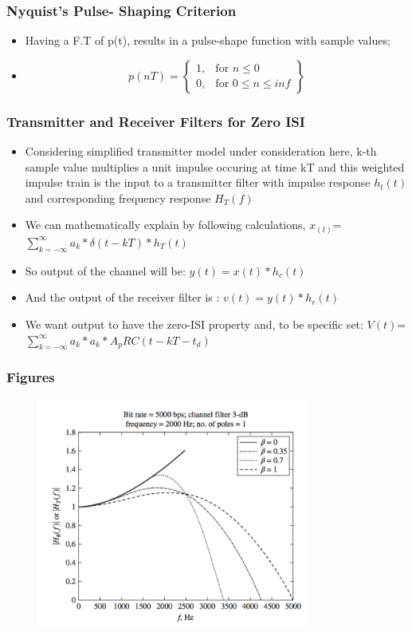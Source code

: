 \documentclass{beamer}
\begin{document}
			\begin{frame}
			\frametitle{Nyquist's Pulse- Shaping Criterion}
			\begin{itemize}
			\item Having a F.T of p(t), results in a pulse-shape function with sample values;
			\item 
			\[
    p(nT) = \left\{\begin{array}{lr}
        1, & \text{for } n\leq 0\\
        0, & \text{for } 0\leq n\leq inf
        \end{array}\right\} 
  \]
  			\end{itemize}
			\end{frame}
			
  			\begin{frame}
			\frametitle{Transmitter and Receiver Filters for Zero ISI}
			\begin{itemize} 
			\item Considering simplified transmitter model under consideration here, k-th sample value multiplies a unit impulse occuring at time kT and this weighted impulse train is the input to a transmitter filter with impulse response $h_t(t)$ and corresponding frequency response $H_T(f)$
			\item We can mathematically explain by following calculations,  $x_(t)$=$\sum_{k=-\infty}^{\infty} a_k*\delta(t-kT)*h_T(t) $
			\item So output of the channel will be: $y(t)= x(t)*h_c(t)$
			\item And the output of the receiver filter is : $v(t)=y(t)*h_r(t)$
			\item  We want output to have the zero-ISI property and, to be specific set: $V(t)$=$\sum_{k=-\infty}^{\infty} a_k*a_k*A_pRC(t-kT-t_d) $
			\end{itemize}
			\end{frame}
			
			\begin{frame}
			\frametitle{Figures}
			\begin{figure}
			\includegraphics[width=0.8\textwidth]{54.png}
			\end{figure}
			\end{frame}
					
			
\end{document}
